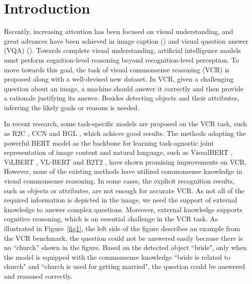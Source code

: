 \documentclass[conference]{IEEEtran}
\begin{document}
\section{Introduction}
Recently, increasing attention has been focused on visual understanding, and great advances have been achieved in image caption (\cite{b1, b2, b3, b4, b5}) and visual question answer (VQA) (\cite{b6, b7, b8, b9}). Towards complete visual understanding, artificial intelligence models must perform cognition-level reasoning beyond recognition-level perception. To move towards this goal, the task of visual commonsense reasoning (VCR) \cite{b10} is proposed along with a well-devised new dataset. In VCR, given a challenging question about an image, a machine should answer it correctly and then provide a rationale justifying its answer. Besides detecting objects and their attributes, inferring the likely goals or reasons is needed.

In recent research, some task-specific models are proposed on the VCR task, such as R2C \cite{b10}, CCN \cite{b17} and HGL \cite{b18}, which achieve good results. The methods adopting the powerful BERT \cite{b11} model as the backbone for learning task-agnostic joint representation of image content and natural language, such as VisualBERT \cite{b12}, ViLBERT \cite{b13}, VL-BERT \cite{b14} and B2T2 \cite{b15}, have shown promising improvements on VCR. However, none of the existing methods have utilized commonsense knowledge in visual commonsense reasoning. In some cases, the explicit recognition results, such as objects or attributes, are not enough for accurate VCR. As not all of the required information is depicted in the image, we need the support of external knowledge to answer complex questions. Moreover, external knowledge supports cognitive reasoning, which is an essential challenge in the VCR task. As illustrated in Figure~\ref{fig1}, the left side of the figure describes an example from the VCR benchmark, the question could not be answered easily because there is no “church” shown in the figure. Based on the detected object “bride", only when the model is equipped with the commonsense knowledge “bride is related to church" and “church is used for getting married", the question could be answered and reasoned correctly.
\end{document}

